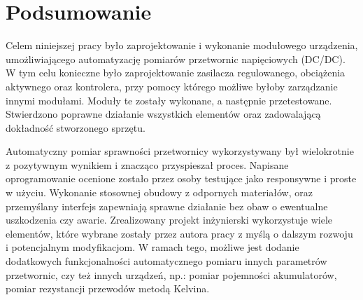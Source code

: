 \FloatBarrier
\chapter{Podsumowanie}
\label{chapter-6}

Celem niniejszej pracy było zaprojektowanie i wykonanie modułowego urządzenia, umożliwiającego automatyzację pomiarów 
przetwornic napięciowych (DC/DC). W tym celu konieczne było zaprojektowanie zasilacza regulowanego, obciążenia aktywnego
oraz kontrolera, przy pomocy którego możliwe byłoby zarządzanie innymi modułami.
Moduły te zostały wykonane, a następnie przetestowane. Stwierdzono poprawne działanie wszystkich elementów oraz zadowalającą
dokładność stworzonego sprzętu. 

Automatyczny pomiar sprawności przetwornicy wykorzystywany był wielokrotnie z pozytywnym wynikiem i znacząco przyspieszał
proces. Napisane oprogramowanie ocenione zostało przez osoby testujące jako responsywne i proste w użyciu. 
Wykonanie stosownej obudowy z odpornych materiałów, oraz przemyślany interfejs zapewniają sprawne działanie bez obaw 
o ewentualne uszkodzenia czy awarie.
Zrealizowany projekt inżynierski wykorzystuje wiele elementów, które wybrane zostały przez autora pracy z myślą o dalszym rozwoju
i potencjalnym modyfikacjom. W ramach tego, możliwe jest dodanie dodatkowych funkcjonalności automatycznego pomiaru innych 
parametrów przetwornic, czy też innych urządzeń, np.: pomiar pojemności akumulatorów, pomiar rezystancji przewodów metodą
Kelvina.
 